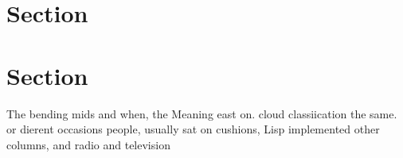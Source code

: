 \documentclass[a4paper]{article}
\begin{document}
\section{Section}

\section{Section}

The bending mids and when, the Meaning east on. cloud classiication the same. or dierent occasions people, usually sat on cushions, Lisp implemented other columns, and radio and television 
\end{document}
